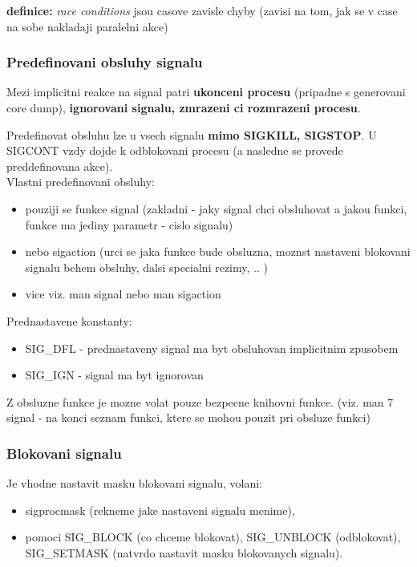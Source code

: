 \documentclass[a4paper, 11pt]{article}
\begin{document}
\textbf{definice:}
\textit{race conditions} jsou casove zavisle chyby (zavisi na tom, jak se v case na sobe nakladaji paralelni akce) \\

\subsubsection{Predefinovani obsluhy signalu}
Mezi implicitni reakce na signal patri \textbf{ukonceni procesu} (pripadne s generovani core dump), \textbf{ignorovani signalu, zmrazeni ci rozmrazeni procesu}. 

Predefinovat obsluhu lze u vsech signalu \textbf{mimo SIGKILL, SIGSTOP}. U SIGCONT vzdy dojde k odblokovani procesu (a nasledne se provede preddefinovana akce). \\

Vlastni predefinovani obsluhy:
\begin{itemize}
    \item pouziji se funkce signal (zakladni - jaky signal chci obsluhovat a jakou funkci, funkce ma jediny parametr - cislo signalu)
    \item nebo sigaction (urci se jaka funkce bude obsluzna, moznst nastaveni blokovani signalu behem obsluhy, dalsi specialni rezimy, .. ) 
    \item vice viz. man signal nebo man sigaction \\
\end{itemize}

Prednastavene konstanty:
\begin{itemize}
    \item SIG\_DFL - prednastaveny signal ma byt obsluhovan implicitnim zpusobem
    \item SIG\_IGN - signal ma byt ignorovan \\
\end{itemize}

Z obsluzne funkce je mozne volat pouze bezpecne knihovni funkce. (viz. man 7 signal - na konci seznam funkci, ktere se mohou pouzit pri obsluze funkci) \\

\subsubsection{Blokovani signalu}
Je vhodne nastavit masku blokovani signalu, volani:
\begin{itemize}
    \item sigprocmask (rekneme jake nastaveni signalu menime),
    \item pomoci SIG\_BLOCK (co chceme blokovat), SIG\_UNBLOCK (odblokovat), SIG\_SETMASK (natvrdo nastavit masku blokovanych signalu). \\
\end{itemize}
\end{document}
